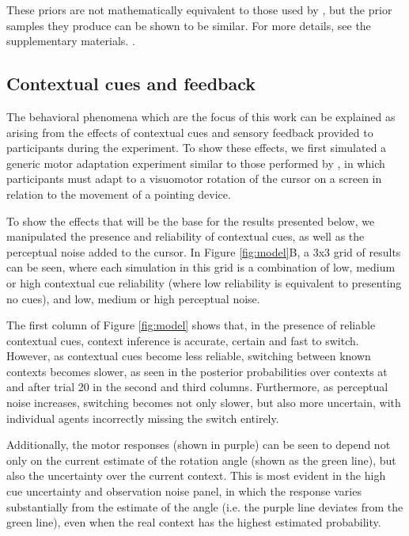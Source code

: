 \documentclass[a4paper,doc,floatsintext,natbib]{apa6}
\def \fref #1{Figure \ref{#1}}     %
\begin{document}
These priors are not mathematically equivalent to those used by \cite{Heald_Contextual_2021}, but the prior samples they produce can be shown to be similar. For more details, see the supplementary materials. .

\subsection{Contextual cues and feedback}
The behavioral phenomena which are the focus of this work can be explained as arising from the effects of contextual cues and sensory feedback provided to participants during the experiment. To show these effects, we first simulated a generic motor adaptation experiment similar to those performed by \cite{Davidson_Scaling_2004}, in which participants must adapt to a visuomotor rotation of the cursor on a screen in relation to the movement of a pointing device.

To show the effects that will be the base for the results presented below, we manipulated the presence and reliability of contextual cues, as well as the perceptual noise added to the cursor. In \fref{fig:model}B, a 3x3 grid of results can be seen, where each simulation in this grid is a combination of low, medium or high contextual cue reliability (where low reliability is equivalent to presenting no cues), and low, medium or high perceptual noise.

The first column of \fref{fig:model} shows that, in the presence of reliable contextual cues, context inference is accurate, certain and fast to switch. However, as contextual cues become less reliable, switching between known contexts becomes slower, as seen in the posterior probabilities over contexts at and after trial 20 in the second and third columns. Furthermore, as perceptual noise increases, switching becomes not only slower, but also more uncertain, with individual agents incorrectly missing the switch entirely.

Additionally, the motor responses (shown in purple) can be seen to depend not only on the current estimate of the rotation angle (shown as the green line), but also the uncertainty over the current context. This is most evident in the high cue uncertainty and observation noise panel, in which the response varies substantially from the estimate of the angle (i.e. the purple line deviates from the green line), even when the real context has the highest estimated probability.
\end{document}
